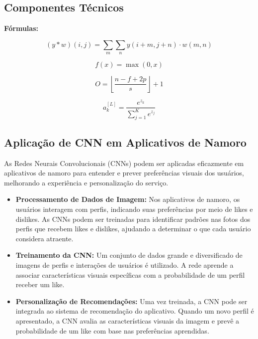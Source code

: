 \subsection{Componentes Técnicos}

\textbf{Fórmulas:}

\begin{equation}
(y * w)(i, j) = \sum_{m}\sum_{n} y(i+m, j+n) \cdot w(m, n)
\end{equation}

\begin{equation}
f(x) = \max(0, x)
\end{equation}

\begin{equation}
O = \left\lfloor \frac{n - f + 2p}{s} \right\rfloor + 1
\end{equation}

\begin{equation}
a^{[L]}_k = \frac{e^{z_k}}{\sum_{j=1}^{K} e^{z_j}}
\end{equation}

\subsection{Aplicação de CNN em Aplicativos de Namoro}

As Redes Neurais Convolucionais (CNNs) podem ser aplicadas eficazmente em aplicativos de namoro para entender e prever preferências visuais dos usuários, melhorando a experiência e personalização do serviço.

\begin{itemize}
    \item \textbf{Processamento de Dados de Imagem:}  
    Nos aplicativos de namoro, os usuários interagem com perfis, indicando suas preferências por meio de likes e dislikes. As CNNs podem ser treinadas para identificar padrões nas fotos dos perfis que recebem likes e dislikes, ajudando a determinar o que cada usuário considera atraente.

    \item \textbf{Treinamento da CNN:}  
    Um conjunto de dados grande e diversificado de imagens de perfis e interações de usuários é utilizado. A rede aprende a associar características visuais específicas com a probabilidade de um perfil receber um like.

    \item \textbf{Personalização de Recomendações:}  
    Uma vez treinada, a CNN pode ser integrada ao sistema de recomendação do aplicativo. Quando um novo perfil é apresentado, a CNN avalia as características visuais da imagem e prevê a probabilidade de um like com base nas preferências aprendidas.
\end{itemize}


